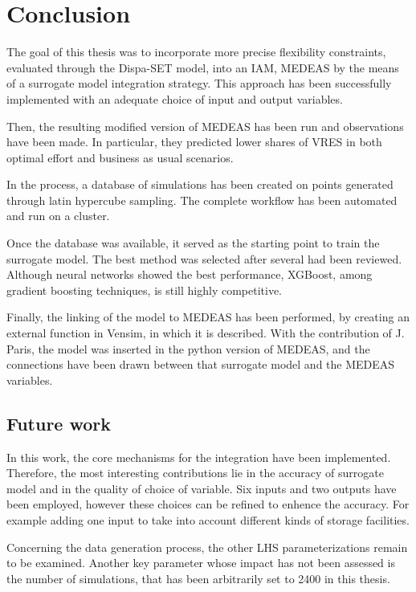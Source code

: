 \section{Conclusion}

The goal of this thesis was to incorporate more precise flexibility constraints, evaluated through the Dispa-SET model, into an IAM, MEDEAS by the means of a surrogate model integration strategy. This approach has been successfully implemented with an adequate choice of input and output variables.

Then, the resulting modified version of MEDEAS has been run and observations have been made. In particular, they predicted lower shares of VRES in both optimal effort and business as usual scenarios.

In the process, a database of simulations has been created on points generated through latin hypercube sampling. The complete workflow has been automated and run on a cluster.

Once the database was available, it served as the starting point to train the surrogate model. The best method was selected after several had been reviewed. Although neural networks showed the best performance, XGBoost, among gradient boosting techniques, is still highly competitive.

Finally, the linking of the model to MEDEAS has been performed, by creating an external function in Vensim, in which it is described. With the contribution of J. Paris, the model was inserted in the python version of MEDEAS, and the connections have been drawn between that surrogate model and the MEDEAS variables.

\subsection{Future work}

In this work, the core mechanisms for the integration have been implemented. Therefore, the most interesting contributions lie in the accuracy of surrogate model and in the quality of choice of variable. Six inputs and two outputs have been employed, however these choices can be refined to enhence the accuracy. For example adding one input to take into account different kinds of storage facilities.

Concerning the data generation process, the other LHS parameterizations remain to be examined. Another key parameter whose impact has not been assessed is the number of simulations, that has been arbitrarily set to 2400 in this thesis.

